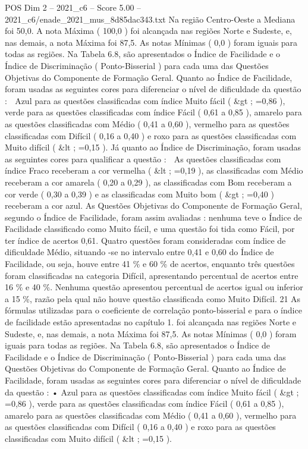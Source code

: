 \begin{textsample}{POS Dim 2 – 2021\_c6 – Score 5.00 – 2021\_c6/enade\_2021\_mus\_8d85dac343.txt}
Na região Centro-Oeste a Mediana foi 50,0.
A nota Máxima ( 100,0 ) foi alcançada nas regiões Norte e Sudeste, e, nas demais, a nota Máxima foi 87,5.
As notas Mínimas ( 0,0 ) foram iguais para todas as regiões.
Na Tabela 6.8, são apresentados o Índice de Facilidade e o Índice de Discriminação ( Ponto-Bisserial ) para cada uma das Questões Objetivas do Componente de Formação Geral.
Quanto ao Índice de Facilidade, foram usadas as seguintes cores para diferenciar o nível de dificuldade da questão :  Azul para as questões classificadas com índice Muito fácil ( \&gt ; =0,86 ), verde para as questões classificadas com índice Fácil ( 0,61 a 0,85 ), amarelo para as questões classificadas com Médio ( 0,41 a 0,60 ), vermelho para as questões classificadas com Difícil ( 0,16 a 0,40 ) e roxo para as questões classificadas com Muito difícil ( \&lt ; =0,15 ).
Já quanto ao Índice de Discriminação, foram usadas as seguintes cores para qualificar a questão :  As questões classificadas com índice Fraco receberam a cor vermelha ( \&lt ; =0,19 ), as classificadas com Médio receberam a cor amarela ( 0,20 a 0,29 ), as classificadas com Bom receberam a cor verde ( 0,30 a 0,39 ) e as classificadas com Muito bom ( \&gt ; =0,40 ) receberam a cor azul.
As Questões Objetivas do Componente de Formação Geral, segundo o Índice de Facilidade, foram assim avaliadas : nenhuma teve o Índice de Facilidade classificado como Muito fácil, e uma questão foi tida como Fácil, por ter índice de acertos 0,61.
Quatro questões foram consideradas com índice de dificuldade Médio, situando -se no intervalo entre 0,41 e 0,60 do Índice de Facilidade, ou seja, houve entre 41 \% e 60 \% de acertos, enquanto três questões foram classificadas na categoria Difícil, apresentando percentual de acertos entre 16 \% e 40 \%.
Nenhuma questão apresentou percentual de acertos igual ou inferior a 15 \%, razão pela qual não houve questão classificada como Muito Difícil. 21 As fórmulas utilizadas para o coeficiente de correlação ponto-bisserial e para o índice de facilidade estão apresentadas no capítulo 1. foi alcançada nas regiões Norte e Sudeste, e, nas demais, a nota Máxima foi 87,5.
As notas Mínimas ( 0,0 ) foram iguais para todas as regiões.
Na Tabela 6.8, são apresentados o Índice de Facilidade e o Índice de Discriminação ( Ponto-Bisserial ) para cada uma das Questões Objetivas do Componente de Formação Geral.
Quanto ao Índice de Facilidade, foram usadas as seguintes cores para diferenciar o nível de dificuldade da questão : • Azul para as questões classificadas com índice Muito fácil ( \&gt ; =0,86 ), verde para as questões classificadas com índice Fácil ( 0,61 a 0,85 ), amarelo para as questões classificadas com Médio ( 0,41 a 0,60 ), vermelho para as questões classificadas com Difícil ( 0,16 a 0,40 ) e roxo para as questões classificadas com Muito difícil ( \&lt ; =0,15 ).

\end{textsample}
